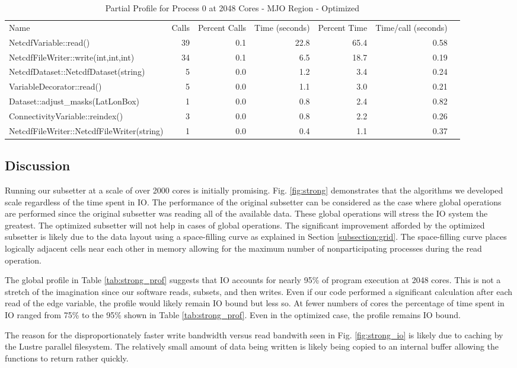 \begin{table*}[!t]
\center
\caption{Partial Profile for Process 0 at 2048 Cores - MJO Region - Optimized}
\label{tab:strong_prof_opt}
\begin{tabular}{lrrrrrr}
Name&Calls&Percent Calls&Time (seconds)&Percent Time&Time/call (seconds)\\
NetcdfVariable::read()                    & 39&0.1&22.8&65.4&0.58\\
NetcdfFileWriter::write(int,int,int)      & 34&0.1& 6.5&18.7&0.19\\
NetcdfDataset::NetcdfDataset(string)      &  5&0.0& 1.2& 3.4&0.24\\
VariableDecorator::read()                 &  5&0.0& 1.1& 3.0&0.21\\
Dataset::adjust\_masks(LatLonBox)         &  1&0.0& 0.8& 2.4&0.82\\
ConnectivityVariable::reindex()           &  3&0.0& 0.8& 2.2&0.26\\
NetcdfFileWriter::NetcdfFileWriter(string)&  1&0.0& 0.4& 1.1&0.37\\
\end{tabular}
\end{table*}

\subsection{Discussion}

Running our subsetter at a scale of over 2000 cores is initially promising.
Fig. \ref{fig:strong} demonstrates that the algorithms we developed scale
regardless of the time spent in IO.  The performance of the original subsetter
can be considered as the case where global operations are performed since the
original subsetter was reading all of the available data.  These global
operations will stress the IO system the greatest.  The optimized subsetter
will not help in cases of global operations.  The significant improvement
afforded by the optimized subsetter is likely due to the data layout using a
space-filling curve as explained in Section \ref{subsection:grid}.  The
space-filling curve places logically adjacent cells near each other in memory
allowing for the maximum number of nonparticipating processes during the read
operation.

The global profile in Table \ref{tab:strong_prof} suggests that IO accounts
for nearly 95\% of program execution at 2048 cores.  This is not a stretch of
the imagination since our software reads, subsets, and then writes.  Even if
our code performed a significant calculation after each read of the edge
variable, the profile would likely remain IO bound but less so.  At fewer
numbers of cores the percentage of time spent in IO ranged from 75\% to the
95\% shown in Table \ref{tab:strong_prof}.  Even in the optimized case, the
profile remains IO bound.

The reason for the disproportionately faster write bandwidth versus read
bandwith seen in Fig. \ref{fig:strong_io} is likely due to caching by the
Lustre parallel filesystem.  The relatively small amount of data being written
is likely being copied to an internal buffer allowing the functions to return
rather quickly.

